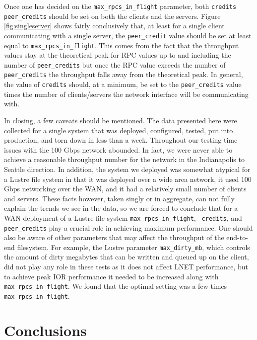 \documentclass[]{sigplan-proc}
\begin{document}
Once one has decided on the {\tt max\_rpcs\_in\_flight} parameter, both {\tt credits} {\tt peer\_credits}
should be set on both the clients and the servers. Figure \ref{fig:singleserver} shows fairly conclusively
that, at least for a single client communicating with a single server, the {\tt peer\_credit} value should be
set at least equal to {\tt max\_rpcs\_in\_flight}. This comes from the fact that the throughput values stay at
the theoretical peak for RPC values up to and including the number of {\tt peer\_credits} but once the RPC
value exceeds the number of {\tt peer\_credits} the throughput falls away from the theoretical peak. In
general, the value of {\tt credits} should, at a minimum, be set to the {\tt peer\_credits} value times the number of
clients/servers the network interface will be communicating with.

In closing, a few caveats should be mentioned. The data presented here were collected for a single system that
was deployed, configured, tested, put into production, and torn down in less than a week. Throughout our
testing time issues with the 100 Gbps network abounded. In fact, we were never able to achieve a reasonable
throughput number for the network in the Indianapolis to Seattle direction. In addition, the system we
deployed was somewhat atypical for a Lustre file system in that it was deployed over a wide area network, it
used 100 Gbps networking over the WAN, and it had a relatively small number of clients and servers. These
facts however, taken singly or in aggregate, can not fully explain the trends we see in the data, so we are
forced to conclude that for a WAN deployment of a Lustre file system {\tt max\_rpcs\_in\_flight}, {\tt
  credits}, and {\tt peer\_credits} play a crucial role in achieving maximum performance. One should also be
aware of other parameters that may affect the throughput of the end-to-end filesystem. For example, the Lustre
parameter {\tt max\_dirty\_mb}, which controls the amount of dirty megabytes that can be written and queued up
on the client, did not play any role in these tests as it does not affect LNET performance,
but to achieve peak IOR performance it needed to be increased along with {\tt max\_rpcs\_in\_flight}. We found
that the optimal setting was a few times {\tt max\_rpcs\_in\_flight}.

\section{Conclusions}\label{sec:conclusion}
\end{document}

